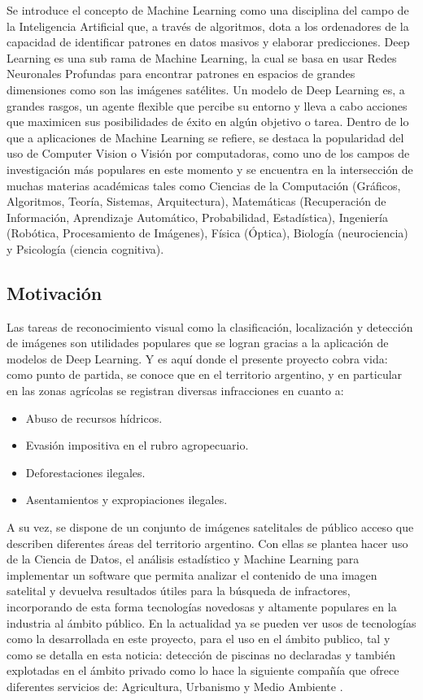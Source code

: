 Se introduce el concepto de Machine Learning como una disciplina del campo de la Inteligencia Artificial que, a través de algoritmos, dota a los ordenadores de la capacidad de identificar patrones en datos masivos y elaborar predicciones. Deep Learning es una sub rama de Machine Learning, la cual se basa en usar Redes Neuronales Profundas para encontrar patrones en espacios de grandes dimensiones como son las imágenes satélites. Un modelo de Deep Learning es, a grandes rasgos, un agente flexible que percibe su entorno y lleva a cabo acciones que maximicen sus posibilidades de éxito en algún objetivo o tarea. Dentro de lo que a aplicaciones de Machine Learning se refiere, se destaca la popularidad del uso de Computer Vision  o Visión por computadoras, como uno de los campos de investigación más populares en este momento y se encuentra en la intersección de muchas materias académicas tales como Ciencias de la Computación (Gráficos, Algoritmos, Teoría, Sistemas, Arquitectura), Matemáticas (Recuperación de Información, Aprendizaje Automático, Probabilidad, Estadística), Ingeniería (Robótica, Procesamiento de Imágenes), Física (Óptica), Biología (neurociencia) y Psicología (ciencia cognitiva). 
\\

\subsection{Motivación}
Las tareas de reconocimiento visual como la clasificación, localización y detección de imágenes son utilidades populares que se logran gracias a la aplicación de modelos de Deep Learning. Y es aquí donde el presente proyecto cobra vida: como punto de partida, se conoce que en el territorio argentino, y en particular en las zonas agrícolas se registran diversas infracciones en cuanto a:
\begin{itemize}
    \item Abuso de recursos hídricos.
    \item Evasión impositiva en el rubro agropecuario.
    \item Deforestaciones ilegales.
    \item Asentamientos y expropiaciones ilegales.
\end{itemize}
A su vez, se dispone de un conjunto de imágenes satelitales de público acceso que describen diferentes áreas del territorio argentino. Con ellas se plantea hacer uso de la Ciencia de Datos, el análisis estadístico y Machine Learning para implementar un software que permita analizar el contenido de una imagen satelital y devuelva resultados útiles para la búsqueda de infractores, incorporando de esta forma tecnologías novedosas y altamente populares en la industria al ámbito público. En la actualidad ya se pueden ver usos de tecnologías como la desarrollada en este proyecto, para el uso en el ámbito publico, tal y como se detalla en esta noticia: detección de piscinas no declaradas \cite{noticia} y también explotadas en el ámbito privado como lo hace la siguiente compañía que ofrece diferentes servicios de: Agricultura, Urbanismo y Medio Ambiente \cite{kermap}.

